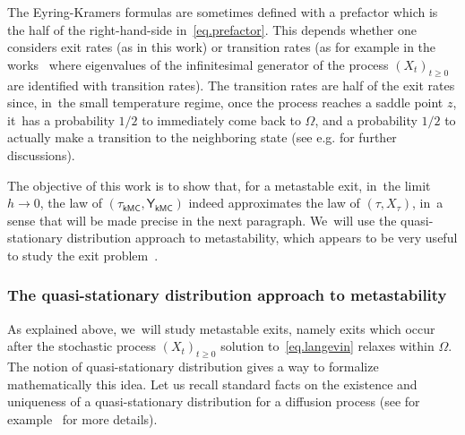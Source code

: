 \begin{remark} The Eyring-Kramers formulas are sometimes defined with
a prefactor which is the half of the right-hand-side in~\eqref{eq.prefactor}. This depends
whether one considers exit rates (as in this work) or transition
rates (as for example in the works~\cite{BEGK,BGK} where eigenvalues
of the infinitesimal generator of the process $(X_t)_{t \ge 0}$ are
identified with transition rates). The transition rates are half of
the exit rates since, in~the small temperature regime,
once the process reaches a saddle point $z$, it~has a probability
$1/2$ to immediately come back to $\Omega$, and a probability $1/2$ to actually
make a transition to the neighboring state (see e.g. \cite[Rem.\,8]{IHPLLN}
for further discussions).
\end{remark}

The objective of this work is to show that, for a metastable exit, in~the limit $h \to 0$,
the law of $(\tau_{\mathsf {kMC}}, \mathsf Y_{\mathsf
{kMC}})$ indeed approximates the law of $(\tau, X_\tau)$, in~a
sense that will be made precise in the next paragraph. We~will use the
quasi-stationary distribution approach to metastability, which appears
to be very useful to study the exit problem~\cite{le2012mathematical,DLLN,bianchi2020soft}.

\subsubsection*{The quasi-stationary distribution approach to metastability}
As explained above, we~will study metastable exits, namely exits which
occur after the stochastic process $(X_t)_{t \ge 0}$ solution
to~\eqref{eq.langevin} relaxes within $\Omega$. The notion of
quasi-stationary distribution gives a way to formalize mathematically
this idea. Let us recall standard facts on the existence and uniqueness of a
quasi-stationary distribution for a diffusion process (see for
example~\cite{cattiaux-collet-lambert-martinez-meleard-san-martin-09,collet-martinez-san-martin-13}
for more details).

